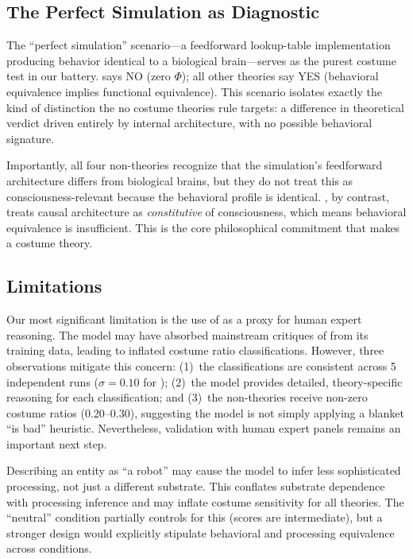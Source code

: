 \subsection{The Perfect Simulation as Diagnostic}
\label{sec:simulation}

The ``perfect simulation'' scenario---a feedforward lookup-table implementation producing behavior identical to a biological brain---serves as the purest costume test in our battery.
\IIT says NO (zero $\Phi$); all other theories say YES (behavioral equivalence implies functional equivalence).
This scenario isolates exactly the kind of distinction the no costume theories rule targets: a difference in theoretical verdict driven entirely by internal architecture, with no possible behavioral signature.

Importantly, all four non-\IIT theories recognize that the simulation's feedforward architecture differs from biological brains, but they do not treat this as consciousness-relevant because the behavioral profile is identical.
\IIT, by contrast, treats causal architecture as \emph{constitutive} of consciousness, which means behavioral equivalence is insufficient.
This is the core philosophical commitment that makes \IIT a costume theory.

\subsection{Limitations}
\label{sec:limitations}

Our most significant limitation is the use of \gptmodel as a proxy for human expert reasoning.
The model may have absorbed mainstream critiques of \IIT from its training data, leading to inflated costume ratio classifications.
However, three observations mitigate this concern: (1)~the classifications are consistent across 5 independent runs ($\sigma = 0.10$ for \IIT); (2)~the model provides detailed, theory-specific reasoning for each classification; and (3)~the non-\IIT theories receive non-zero costume ratios (0.20--0.30), suggesting the model is not simply applying a blanket ``\IIT is bad'' heuristic.
Nevertheless, validation with human expert panels remains an important next step.

Describing an entity as ``a robot'' may cause the model to infer less sophisticated processing, not just a different substrate.
This conflates substrate dependence with processing inference and may inflate costume sensitivity for all theories.
The ``neutral'' condition partially controls for this (scores are intermediate), but a stronger design would explicitly stipulate behavioral and processing equivalence across conditions.

